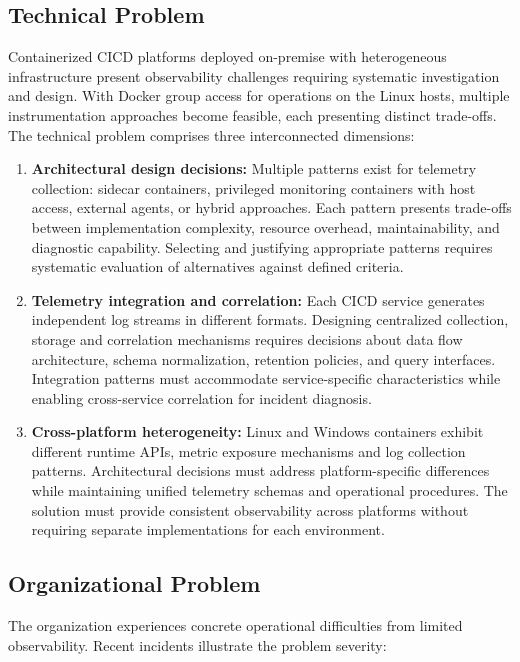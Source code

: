 \subsection{Technical Problem}
Containerized \ac{CICD} platforms deployed on-premise with heterogeneous infrastructure present observability challenges requiring systematic investigation and design. With Docker group access for operations on the Linux hosts, multiple instrumentation approaches become feasible, each presenting distinct trade-offs. The technical problem comprises three interconnected dimensions:

\begin{enumerate}
    \item \textbf{Architectural design decisions:} Multiple patterns exist for telemetry collection: sidecar containers, privileged monitoring containers with host access, external agents, or hybrid approaches. Each pattern presents trade-offs between implementation complexity, resource overhead, maintainability, and diagnostic capability. Selecting and justifying appropriate patterns requires systematic evaluation of alternatives against defined criteria.
    \item \textbf{Telemetry integration and correlation:} Each \ac{CICD} service generates independent log streams in different formats. Designing centralized collection, storage and correlation mechanisms requires decisions about data flow architecture, schema normalization, retention policies, and query interfaces. Integration patterns must accommodate service-specific characteristics while enabling cross-service correlation for incident diagnosis.
    \item \textbf{Cross-platform heterogeneity:} Linux and Windows containers exhibit different runtime APIs, metric exposure mechanisms and log collection patterns. Architectural decisions must address platform-specific differences while maintaining unified telemetry schemas and operational procedures. The solution must provide consistent observability across platforms without requiring separate implementations for each environment.
\end{enumerate}

\subsection{Organizational Problem}
The organization experiences concrete operational difficulties from limited observability. Recent incidents illustrate the problem severity:

